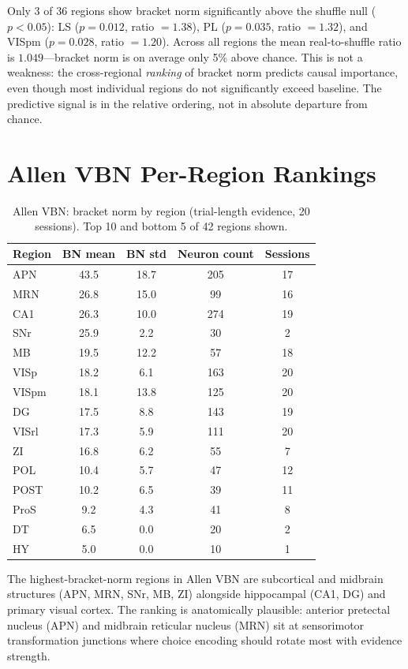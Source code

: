 \documentclass[9pt,lineno]{elife}
\begin{document}
Only 3 of 36 regions show bracket norm significantly above the shuffle null ($p < 0.05$): LS ($p = 0.012$, ratio $= 1.38$), PL ($p = 0.035$, ratio $= 1.32$), and VISpm ($p = 0.028$, ratio $= 1.20$). Across all regions the mean real-to-shuffle ratio is $1.049$---bracket norm is on average only 5\% above chance. This is not a weakness: the cross-regional \emph{ranking} of bracket norm predicts causal importance, even though most individual regions do not significantly exceed baseline. The predictive signal is in the relative ordering, not in absolute departure from chance.

\section{Allen VBN Per-Region Rankings}
\label{app:vbn}

\begin{table}[h]
\centering
\caption{Allen VBN: bracket norm by region (trial-length evidence, 20 sessions). Top 10 and bottom 5 of 42 regions shown.}
\label{tab:vbn_regions}
\small
\begin{tabular}{lcccc}
\toprule
Region & BN mean & BN std & Neuron count & Sessions \\
\midrule
APN & 43.5 & 18.7 & 205 & 17 \\
MRN & 26.8 & 15.0 & 99 & 16 \\
CA1 & 26.3 & 10.0 & 274 & 19 \\
SNr & 25.9 & 2.2 & 30 & 2 \\
MB & 19.5 & 12.2 & 57 & 18 \\
VISp & 18.2 & 6.1 & 163 & 20 \\
VISpm & 18.1 & 13.8 & 125 & 20 \\
DG & 17.5 & 8.8 & 143 & 19 \\
VISrl & 17.3 & 5.9 & 111 & 20 \\
ZI & 16.8 & 6.2 & 55 & 7 \\
\midrule
POL & 10.4 & 5.7 & 47 & 12 \\
POST & 10.2 & 6.5 & 39 & 11 \\
ProS & 9.2 & 4.3 & 41 & 8 \\
DT & 6.5 & 0.0 & 20 & 2 \\
HY & 5.0 & 0.0 & 10 & 1 \\
\bottomrule
\end{tabular}
\end{table}

The highest-bracket-norm regions in Allen VBN are subcortical and midbrain structures (APN, MRN, SNr, MB, ZI) alongside hippocampal (CA1, DG) and primary visual cortex. The ranking is anatomically plausible: anterior pretectal nucleus (APN) and midbrain reticular nucleus (MRN) sit at sensorimotor transformation junctions where choice encoding should rotate most with evidence strength.
\end{document}
